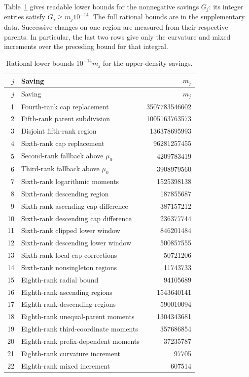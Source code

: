 Table~\ref{num:upper-table} gives readable lower bounds for the
nonnegative savings $G_j$: its integer entries satisfy
$G_j\ge m_j10^{-14}$. The full rational bounds are in the
supplementary data. Successive changes on one region are measured
from their respective parents. In particular, the last two rows
give only the curvature and mixed increments over the preceding
bound for that integral.

\begin{longtable}{@{}r p{} r@{}}
\caption{Rational lower bounds $10^{-14}m_j$ for the upper-density savings.}
\label{num:upper-table}\\
\toprule
$j$ & Saving & $m_j$\\
\midrule
\endfirsthead
\toprule $j$ & Saving & $m_j$\\\midrule
\endhead
1 & Fourth-rank cap replacement & 3507783546602\\
2 & Fifth-rank parent subdivision & 1005163763573\\
3 & Disjoint fifth-rank region & 136378695993\\
4 & Sixth-rank cap replacement & 96281257455\\
5 & Second-rank fallback above $\mu_0$ & 4209783419\\
6 & Third-rank fallback above $\mu_0$ & 3908979560\\
7 & Sixth-rank logarithmic moments & 1525398138\\
8 & Sixth-rank descending region & 187855687\\
9 & Sixth-rank ascending cap difference & 387157212\\
10 & Sixth-rank descending cap difference & 236377744\\
11 & Sixth-rank clipped lower window & 846201484\\
12 & Sixth-rank descending lower window & 500857555\\
13 & Sixth-rank local cap corrections & 50721206\\
14 & Sixth-rank nonsingleton regions & 11743733\\
15 & Eighth-rank radial bound & 94105689\\
16 & Eighth-rank ascending regions & 1543640141\\
17 & Eighth-rank descending regions & 590010094\\
18 & Eighth-rank unequal-parent moments & 1304343681\\
19 & Eighth-rank third-coordinate moments & 357686854\\
20 & Eighth-rank prefix-dependent moments & 37235787\\
21 & Eighth-rank curvature increment & 97705\\
22 & Eighth-rank mixed increment & 607514\\
\bottomrule
\end{longtable}

